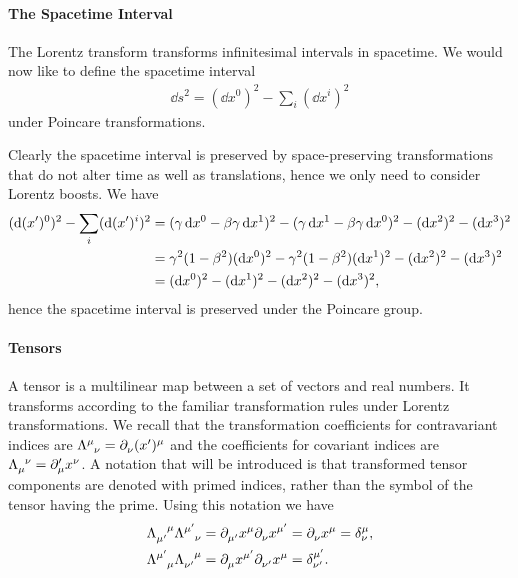 \paragraph{The Spacetime Interval}
The Lorentz transform transforms infinitesimal intervals in spacetime. We would now like to define the spacetime interval
\begin{align*}
	\dd{s}^{2} = (\dd{x^{0}})^{2} - \sum\limits_{i}(\dd{x^{i}})^{2}
\end{align*}
under Poincare transformations.

Clearly the spacetime interval is preserved by space-preserving transformations that do not alter time as well as translations, hence we only need to consider Lorentz boosts. We have
\begin{align*}
	(\dd{(x^{\prime})^{0}})^{2} - \sum\limits_{i}(\dd{(x^{\prime})^{i}})^{2} &= (\gamma\dd{x^{0}} - \beta\gamma\dd{x^{1}})^{2} - (\gamma\dd{x^{1}} - \beta\gamma\dd{x^{0}})^{2} - (\dd{x^{2}})^{2} - (\dd{x^{3}})^{2} \\
	                                                           &= \gamma^{2}(1 - \beta^{2})(\dd{x^{0}})^{2} - \gamma^{2}(1 - \beta^{2})(\dd{x^{1}})^{2} - (\dd{x^{2}})^{2} - (\dd{x^{3}})^{2} \\
	                                                           &= (\dd{x^{0}})^{2} - (\dd{x^{1}})^{2} - (\dd{x^{2}})^{2} - (\dd{x^{3}})^{2},
\end{align*}
hence the spacetime interval is preserved under the Poincare group.

\paragraph{Tensors}
A tensor is a multilinear map between a set of vectors and real numbers. It transforms according to the familiar transformation rules under Lorentz transformations. We recall that the transformation coefficients for contravariant indices are $\trcou{\mu}{\nu} = \del{\nu}{(x\p)^{\mu}}$ and the coefficients for covariant indices are $\trcod{\mu}{\nu} = \del[\prime]{\mu}{x^{\nu}}$. A notation that will be introduced is that transformed tensor components are denoted with primed indices, rather than the symbol of the tensor having the prime. Using this notation we have
\begin{align*}
	\trcod{\mu\p}{\mu}\trcou{\mu\p}{\nu} &= \del{\mu\p}{x^{\mu}}\del{\nu}{x^{\mu\p}} = \del{\nu}{x^{\mu}} = \kdelta{\mu}{\nu}, \\
	\trcou{\mu\p}{\mu}\trcod{\nu\p}{\mu} &= \del{\mu}{x^{\mu\p}}\del{\nu\p}{x^{\mu}} = \kdelta{\mu\p}{\nu\p}.
\end{align*}


